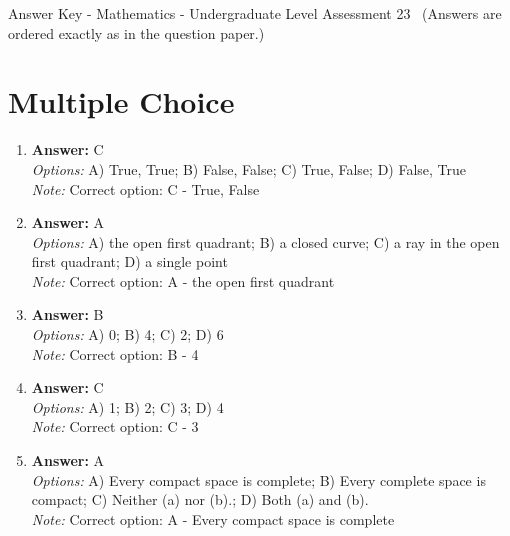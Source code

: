 \documentclass[12pt]{article}
\begin{document}
\begin{center}
Answer Key - Mathematics - Undergraduate Level Assessment 23 \
\small (Answers are ordered exactly as in the question paper.)
\end{center}

\section*{Multiple Choice}
\begin{enumerate}[label=\arabic*.]
\item \textbf{Answer:} C
\\ \textit{Options:} A) True, True; B) False, False; C) True, False; D) False, True
\\ \textit{Note:} Correct option: C - True, False
\item \textbf{Answer:} A
\\ \textit{Options:} A) the open first quadrant; B) a closed curve; C) a ray in the open first quadrant; D) a single point
\\ \textit{Note:} Correct option: A - the open first quadrant
\item \textbf{Answer:} B
\\ \textit{Options:} A) 0; B) 4; C) 2; D) 6
\\ \textit{Note:} Correct option: B - 4
\item \textbf{Answer:} C
\\ \textit{Options:} A) 1; B) 2; C) 3; D) 4
\\ \textit{Note:} Correct option: C - 3
\item \textbf{Answer:} A
\\ \textit{Options:} A) Every compact space is complete; B) Every complete space is compact; C) Neither (a) nor (b).; D) Both (a) and (b).
\\ \textit{Note:} Correct option: A - Every compact space is complete
\end{enumerate}
\end{document}
